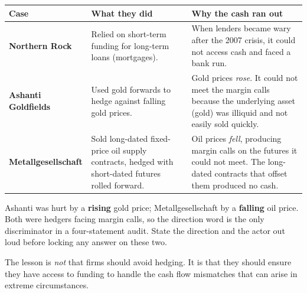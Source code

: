 \begin{center}
\small
\begin{tabularx}{\textwidth}{@{}p{3.05cm} X X@{}}
\toprule
\rowcolor{FRMSoft}\textbf{Case} & \textbf{What they did} & \textbf{Why the cash ran out} \\
\midrule
\textbf{Northern Rock} & Relied on short-term funding for long-term loans (mortgages). & When lenders became wary after the 2007 crisis, it could not access cash and faced a bank run. \\
\addlinespace
\textbf{Ashanti Goldfields} & Used gold forwards to hedge against falling gold prices. & Gold prices \emph{rose}. It could not meet the margin calls because the underlying asset (gold) was illiquid and not easily sold quickly. \\
\addlinespace
\textbf{Metallgesellschaft} & Sold long-dated fixed-price oil supply contracts, hedged with short-dated futures rolled forward. & Oil prices \emph{fell}, producing margin calls on the futures it could not meet. The long-dated contracts that offset them produced no cash. \\
\bottomrule
\end{tabularx}
\end{center}

\begin{lrtrapbox}
Ashanti was hurt by a \textbf{rising} gold price; Metallgesellschaft by a \textbf{falling} oil price. Both were hedgers facing margin calls, so the direction word is the only discriminator in a four-statement audit. State the direction and the actor out loud before locking any answer on these two.
\end{lrtrapbox}

\begin{lrkeybox}
The lesson is \emph{not} that firms should avoid hedging. It is that they should ensure they have access to funding to handle the cash flow mismatches that can arise in extreme circumstances.
\end{lrkeybox}


